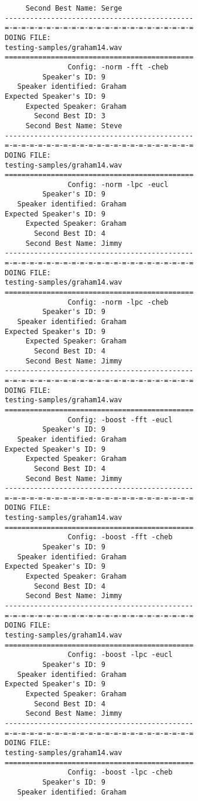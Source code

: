 \begin{verbatim}
     Second Best Name: Serge
---------------------------------------------
=-=-=-=-=-=-=-=-=-=-=-=-=-=-=-=-=-=-=-=-=-=-=
DOING FILE:
testing-samples/graham14.wav
=============================================
               Config: -norm -fft -cheb
         Speaker's ID: 9
   Speaker identified: Graham
Expected Speaker's ID: 9
     Expected Speaker: Graham
       Second Best ID: 3
     Second Best Name: Steve
---------------------------------------------
=-=-=-=-=-=-=-=-=-=-=-=-=-=-=-=-=-=-=-=-=-=-=
DOING FILE:
testing-samples/graham14.wav
=============================================
               Config: -norm -lpc -eucl
         Speaker's ID: 9
   Speaker identified: Graham
Expected Speaker's ID: 9
     Expected Speaker: Graham
       Second Best ID: 4
     Second Best Name: Jimmy
---------------------------------------------
=-=-=-=-=-=-=-=-=-=-=-=-=-=-=-=-=-=-=-=-=-=-=
DOING FILE:
testing-samples/graham14.wav
=============================================
               Config: -norm -lpc -cheb
         Speaker's ID: 9
   Speaker identified: Graham
Expected Speaker's ID: 9
     Expected Speaker: Graham
       Second Best ID: 4
     Second Best Name: Jimmy
---------------------------------------------
=-=-=-=-=-=-=-=-=-=-=-=-=-=-=-=-=-=-=-=-=-=-=
DOING FILE:
testing-samples/graham14.wav
=============================================
               Config: -boost -fft -eucl
         Speaker's ID: 9
   Speaker identified: Graham
Expected Speaker's ID: 9
     Expected Speaker: Graham
       Second Best ID: 4
     Second Best Name: Jimmy
---------------------------------------------
=-=-=-=-=-=-=-=-=-=-=-=-=-=-=-=-=-=-=-=-=-=-=
DOING FILE:
testing-samples/graham14.wav
=============================================
               Config: -boost -fft -cheb
         Speaker's ID: 9
   Speaker identified: Graham
Expected Speaker's ID: 9
     Expected Speaker: Graham
       Second Best ID: 4
     Second Best Name: Jimmy
---------------------------------------------
=-=-=-=-=-=-=-=-=-=-=-=-=-=-=-=-=-=-=-=-=-=-=
DOING FILE:
testing-samples/graham14.wav
=============================================
               Config: -boost -lpc -eucl
         Speaker's ID: 9
   Speaker identified: Graham
Expected Speaker's ID: 9
     Expected Speaker: Graham
       Second Best ID: 4
     Second Best Name: Jimmy
---------------------------------------------
=-=-=-=-=-=-=-=-=-=-=-=-=-=-=-=-=-=-=-=-=-=-=
DOING FILE:
testing-samples/graham14.wav
=============================================
               Config: -boost -lpc -cheb
         Speaker's ID: 9
   Speaker identified: Graham

\end{verbatim}
